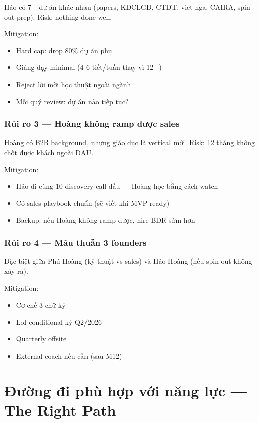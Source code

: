 \documentclass[11pt,a4paper]{article}
\begin{document}
Hảo có 7+ dự án khác nhau (papers, KĐCLGD, CTĐT, viet-nga, CAIRA, spin-out
prep). Risk: nothing done well.

Mitigation:
\begin{itemize}
\item Hard cap: drop 80\% dự án phụ
\item Giảng dạy minimal (4-6 tiết/tuần thay vì 12+)
\item Reject lời mời học thuật ngoài ngành
\item Mỗi quý review: dự án nào tiếp tục?
\end{itemize}

\subsubsection*{Rủi ro 3 --- Hoàng không ramp được sales}

Hoàng có B2B background, nhưng giáo dục là vertical mới. Risk: 12 tháng không
chốt được khách ngoài DAU.

Mitigation:
\begin{itemize}
\item Hảo đi cùng 10 discovery call đầu --- Hoàng học bằng cách watch
\item Có sales playbook chuẩn (sẽ viết khi MVP ready)
\item Backup: nếu Hoàng không ramp được, hire BDR sớm hơn
\end{itemize}

\subsubsection*{Rủi ro 4 --- Mâu thuẫn 3 founders}

Đặc biệt giữa Phú-Hoàng (kỹ thuật vs sales) và Hảo-Hoàng (nếu spin-out không
xảy ra).

Mitigation:
\begin{itemize}
\item Cơ chế 3 chữ ký
\item LoI conditional ký Q2/2026
\item Quarterly offsite
\item External coach nếu cần (sau M12)
\end{itemize}

\clearpage

\section{Đường đi phù hợp với năng lực --- The Right Path}
\end{document}
